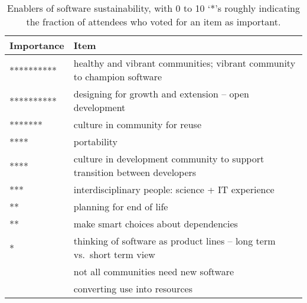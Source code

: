 \documentclass[11pt, oneside]{amsart}
\begin{document}
\begin{table*}[ht]
 \centering
\caption{Enablers of software sustainability, with 0 to 10 `*'s roughly
indicating the fraction of attendees who voted for an item as important.}
\label{tb:software_sustainability_enablers}
  \begin{scriptsize}
  \begin{tabular}{ | p{1.65cm} | p{10.0cm} |}
    \hline
  Importance & Item \\ \hline \hline
********** & healthy and vibrant communities; vibrant community to champion software \\ \hline
********** & designing for growth and extension -- open development \\ \hline
******* & culture in community for reuse \\ \hline
**** & portability \\ \hline
**** & culture in development community to support transition between developers \\ \hline
*** & interdisciplinary people: science + IT experience \\ \hline
** & planning for end of life \\ \hline
** & make smart choices about dependencies \\ \hline
* & thinking of software as product lines -- long term vs.~short term view \\ \hline
 & not all communities need new software \\ \hline
 & converting use into resources \\ \hline
    \end{tabular}
    \end{scriptsize}
\end{table*}
\end{document}
